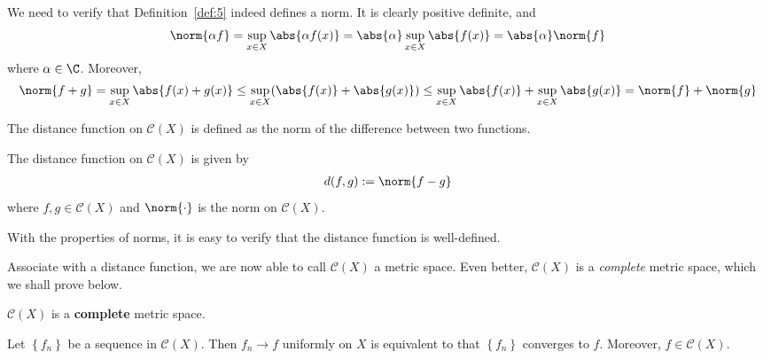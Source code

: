 \documentclass[thmcnt=section, 12pt]{elegantbook}
\begin{document}
\begin{remark}
    We need to verify that Definition~\ref{def:5} indeed defines a norm. It is clearly positive definite, and 
    \begin{align*}
        \norm{\alpha f} 
        = \sup_{x \in X}\abs{\alpha f(x)}
        = \abs{\alpha} \sup_{x \in X} \abs{f(x)}
        = \abs{\alpha} \norm{f}
    \end{align*}
    where $\alpha \in \C$. Moreover, 
    \begin{align*}
        \norm{f+g}
        = \sup_{x \in X} \abs{f(x) + g(x)}
        \leq \sup_{x \in X} (\abs{f(x)} + \abs{g(x)})
        \leq \sup_{x \in X}\abs{f(x)} + \sup_{x \in X}\abs{g(x)}
        = \norm{f} + \norm{g}
    \end{align*}
\end{remark}


\par The distance function on $\mathscr{C}(X)$ is defined as the norm of the difference between two functions.

\begin{definition}
    The distance function on $\mathscr{C}(X)$ is given by 
    \begin{align*}
        d(f, g) := \norm{f - g}
    \end{align*}
    where $f, g \in \mathscr{C}(X)$ and $\norm{\cdot}$ is the norm on $\mathscr{C}(X)$.
\end{definition}

\begin{remark}
    With the properties of norms, it is easy to verify that the distance function is well-defined.
\end{remark}


\par Associate with a distance function, we are now able to call $\mathscr{C}(X)$ a metric space. Even better, $\mathscr{C}(X)$ is a \textit{complete} metric space, which we shall prove below.

\begin{theorem}
    $\mathscr{C}(X)$ is a \textbf{complete} metric space.
\end{theorem}

\begin{remark}
    Let $\left\{f_n\right\}$ be a sequence in $\mathscr{C}(X)$. Then $f_n \to f$ uniformly on $X$ is equivalent to that $\left\{f_n\right\}$ converges to $f$. Moreover, $f \in \mathscr{C}(X)$.
\end{remark}
\end{document}
